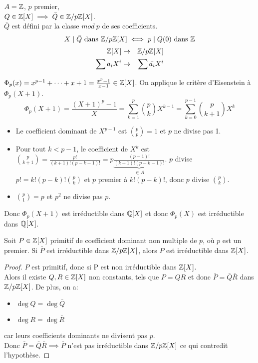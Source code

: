 \begin{example}
	$A = \mathbb{Z}$, $p$ premier,\\
	$Q \in \mathbb{Z}[X] \implies \bar{Q} \in \mathbb{Z}/p\mathbb{Z}[X]$.\\
	$\bar{Q}$ est défini par la classe $mod\  p$ de ses coefficients.
	$$X \mid \bar{Q} \text{ dans } \mathbb{Z}/p\mathbb{Z}[X] \iff p \mid Q(0) \text{ dans } \mathbb{Z}$$
	\begin{eqnarray*}
		\mathbb{Z}[X] &\to& \mathbb{Z}/p\mathbb{Z}[X] \\
		\sum a_iX^i &\mapsto& \sum \bar{a_i}X^i
	\end{eqnarray*}
\end{example}


\begin{example}
	$\Phi_p(x) = x^{p-1} + \cdots + x + 1  = \frac{x^p - 1}{x-1} \in \mathbb{Z}[X]$.
	On applique le critère d'Eisenstein à $\Phi_p(X+1)$.
	$$ \Phi_p(X+1) = \frac{(X+1)^p - 1}{X} = \sum_{k=1}^p \binom{p}{k} X^{k-1} = \sum_{k=0}^{p-1} \binom{p}{k+1} X^k$$
	\begin{itemize}
		\item Le coefficient dominant de $X^{p-1}$ est $\binom{p}{p} = 1$ et $p$ ne divise pas 1.
		\item Pour tout $k < p-1$, le coefficient de $X^k$ est $\binom{p}{k+1} = \frac{p!}{(k+1)!(p-k-1)!} = p \underbrace{\frac{(p-1)!}{(k+1)!(p-k-1)!}}_{\in A}$.
		      $p$ divise $p! = k!(p-k)!\binom{p}{k}$ et $p$ premier à $k!(p-k)!$, donc $p$ divise $\binom{p}{k}$.
		\item $\binom{p}{1} = p$ et $p^2$ ne divise pas $p$.
	\end{itemize}
	Donc $\Phi_p(X+1)$ est irréductible dans $\mathbb{Q}[X]$ et donc $\Phi_p(X)$ est irréductible dans $\mathbb{Q}[X]$.
\end{example}


\begin{prop}
	Soit $P \in \mathbb{Z}[X]$ primitif de coefficient dominant non multiple de $p$, où $p$ est un premier.
	Si $\bar{P}$ est irréductible dans  $\mathbb{Z}/p\mathbb{Z}[X]$, alors $P$ est irréductible dans $\mathbb{Z}[X]$.
\end{prop}

\begin{proof}
	$P$ est primitif, donc si P est non irréductible dans $\mathbb{Z}[X]$.\\
	Alors il existe $Q, R \in \mathbb{Z}[X]$ non constants, tels que $P = QR$
	et donc $\bar{P} = \bar{Q}\bar{R}$ dans $\mathbb{Z}/p\mathbb{Z}[X]$.
	De plus, on a:
	\begin{itemize}
		\item $\deg Q = \deg \bar{Q}$
		\item $\deg R = \deg \bar{R}$

	\end{itemize}
	car leurs coefficients dominants ne divisent pas $p$.\\
	Donc $\bar{P} = \bar{Q}\bar{R} \implies \bar{P}$ n'est pas irréductible dans $\mathbb{Z}/p\mathbb{Z}[X]$ ce qui contredit l'hypothèse.
\end{proof}
